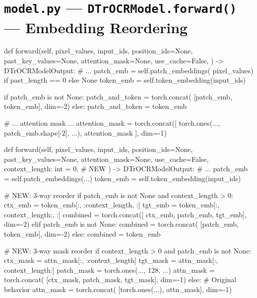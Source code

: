 \documentclass[11pt, a4paper]{report}
\begin{document}
\section{\texttt{model.py} --- \texttt{DTrOCRModel.forward()} --- Embedding Reordering}
\label{sec:code-model-transformer}

\begin{minipage}[t]{0.48\textwidth}
\begin{originalcode}
def forward(self, pixel_values, input_ids,
    position_ids=None, past_key_values=None,
    attention_mask=None, use_cache=False,
) -> DTrOCRModelOutput:
    # ...
    patch_emb = self.patch_embeddings(
      pixel_values) if past_length == 0 else None
    token_emb = self.token_embedding(input_ids)

    if patch_emb is not None:
      patch_and_token = torch.concat(
        [patch_emb, token_emb], dim=-2)
    else:
      patch_and_token = token_emb

    # ... attention mask ...
    attention_mask = torch.concat([
      torch.ones(..., patch_emb.shape[-2], ...),
      attention_mask
    ], dim=-1)
\end{originalcode}
\end{minipage}
\hfill
\begin{minipage}[t]{0.48\textwidth}
\begin{newcode}
def forward(self, pixel_values, input_ids,
    position_ids=None, past_key_values=None,
    attention_mask=None, use_cache=False,
    context_length: int = 0,        # NEW
) -> DTrOCRModelOutput:
    # ...
    patch_emb = self.patch_embeddings(...)
    token_emb = self.token_embedding(input_ids)

    # NEW: 3-way reorder
    if patch_emb is not None and context_length > 0:
      ctx_emb = token_emb[:, :context_length, :]
      tgt_emb = token_emb[:, context_length:, :]
      combined = torch.concat([
        ctx_emb, patch_emb, tgt_emb], dim=-2)
    elif patch_emb is not None:
      combined = torch.concat(
        [patch_emb, token_emb], dim=-2)
    else:
      combined = token_emb

    # NEW: 3-way mask reorder
    if context_length > 0 and patch_emb is not None:
      ctx_mask = attn_mask[:, :context_length]
      tgt_mask = attn_mask[:, context_length:]
      patch_mask = torch.ones(..., 128, ...)
      attn_mask = torch.concat(
        [ctx_mask, patch_mask, tgt_mask], dim=-1)
    else:
      # Original behavior
      attn_mask = torch.concat(
        [torch.ones(...), attn_mask], dim=-1)
\end{newcode}
\end{minipage}
\end{document}
